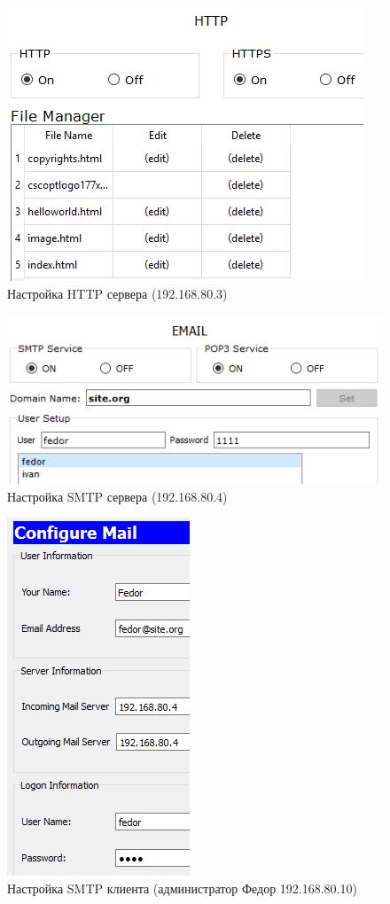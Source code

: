 \begin{figure}[h!]
	\centering
	\includegraphics[scale = 0.82]{images/5_3.png}
	\caption{Настройка HTTP сервера (192.168.80.3)}
	\label{image:5_3}
\end{figure}

\begin{figure}[h!]
	\centering
	\includegraphics[scale = 0.82]{images/5_4.png}
	\caption{Настройка SMTP сервера (192.168.80.4)}
	\label{image:5_4}
\end{figure}

\clearpage

\begin{figure}[h!]
	\centering
	\includegraphics[scale = 0.76]{images/5_4_1.png}
	\caption{Настройка SMTP клиента (администратор Федор 192.168.80.10)}
	\label{image:5_4_1}
\end{figure}

